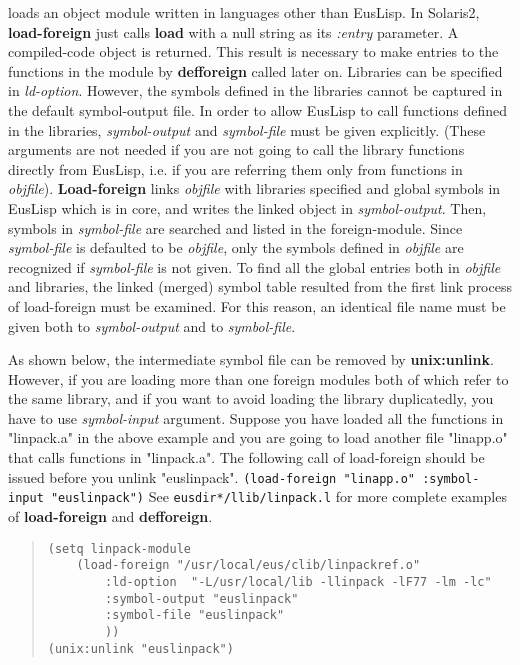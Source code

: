 \begin{refdesc}

{loads an object module written in languages other than EusLisp.
In Solaris2, {\bf load-foreign} just calls {\bf load} with a null string
as its {\em :entry} parameter.
A compiled-code object is returned.
This result is necessary to make entries to the functions in the module by
{\bf defforeign} called later on.
Libraries can be specified in {\em ld-option}.
However, the symbols defined in the libraries cannot be captured
in the default symbol-output file.
In order to allow EusLisp to call functions defined in the libraries,
{\em symbol-output} and {\em symbol-file} must be given explicitly.
(These arguments are not needed if you are not going to call the library
functions directly from EusLisp, i.e. if you are  referring them only from
functions in {\em objfile}).
{\bf Load-foreign} links {\em objfile} with libraries specified and global
symbols in EusLisp which is in core, and writes the linked object in
{\em symbol-output}.
Then, symbols in {\em symbol-file} are searched and listed in the
foreign-module. Since {\em symbol-file} is defaulted to be {\em objfile},
only the symbols defined in {\em objfile} are  recognized if {\em symbol-file}
is not given. To find all the global entries both in {\em objfile} and
libraries, the linked (merged) symbol table resulted from the first link
process of load-foreign must be examined.
For this reason, an identical file name must be given both to {\em symbol-output}
and to {\em symbol-file}.

As shown below, the intermediate symbol file can be removed
by {\bf unix:unlink}.
However, if you are loading more than one foreign modules both of which 
refer to the same library, and if you want to avoid loading
the library duplicatedly, you have to use {\em symbol-input} argument.
Suppose you have loaded all the functions in "linpack.a" in the above
example and you are going to load another file "linapp.o" that calls functions
in "linpack.a".
The following call of load-foreign should be issued before you
unlink "euslinpack".
{\tt (load-foreign "linapp.o" :symbol-input "euslinpack")}
See {\tt *eusdir*/llib/linpack.l} for more complete examples of
{\bf load-foreign} and {\bf defforeign}.
}
\begin{quote}
\begin{verbatim}
(setq linpack-module
    (load-foreign "/usr/local/eus/clib/linpackref.o"
        :ld-option  "-L/usr/local/lib -llinpack -lF77 -lm -lc"
        :symbol-output "euslinpack"
        :symbol-file "euslinpack"
        ))
(unix:unlink "euslinpack")
\end{verbatim}
\end{quote}


\end{refdesc}
